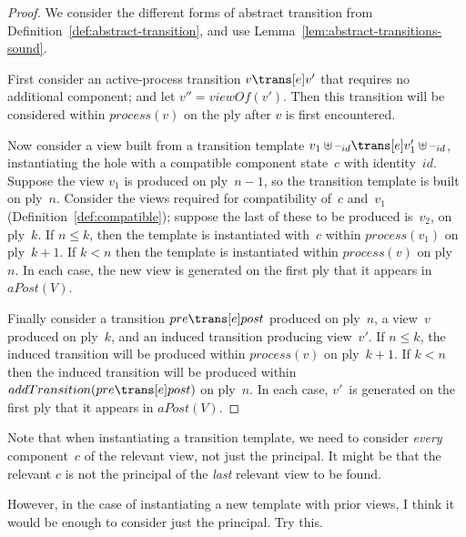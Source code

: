 
\begin{proof}
We consider the different forms of abstract transition from
Definition~\ref{def:abstract-transition}, and use
Lemma~\ref{lem:abstract-transitions-sound}. 

First consider an active-process transition $v \trans[e] v'$ that requires no
additional component; and let $v'' = viewOf(v')$.  Then this transition will
be considered within $process(v)$ on the ply after $v$ is first encountered.

Now consider a view built from a transition template $v_1 \uplus \hole{id}
\trans[e] v_1' \uplus \hole{id}$, instantiating the hole with a compatible
component state~$c$ with identity~$id$.  Suppose the view $v_1$ is produced
on ply~$n-1$, so the transition template is built on ply~$n$.  Consider the
views required for compatibility of~$c$ and~$v_1$
(Definition~\ref{def:compatible}); suppose the last of these to be produced
is~$v_2$, on ply~$k$.
If $n \le k$, then the template is instantiated with~$c$ within $process(v_1)$
on ply~$k+1$.  If $k < n$ then the template is instantiated within $process(v)$
on ply~$n$.  In each case, the new view is generated on the first ply that it
appears in $aPost(V)$. 

Finally consider a transition $pre \trans[e] post$ produced on ply~$n$, a
view~$v$ produced on ply~$k$, and an induced transition producing view~$v'$.
If $n \le k$, the induced transition will be produced within $process(v)$ on
ply~$k+1$.  If $k < n$ then the induced transition will be produced within
$addTransition(pre \trans[e] post)$ on ply~$n$.  In each case, $v'$~is
generated on the first ply that it appears in $aPost(V)$.
\end{proof}

Note that when instantiating a transition template, we need to
consider \emph{every} component~$c$ of the relevant view, not just the
principal.  It might be that the relevant $c$ is not the principal of the
\emph{last} relevant view to be found.
\begin{improve}
However, in the case of instantiating a new template with prior views, I think
it would be enough to consider just the principal.  Try this.
\end{improve}
